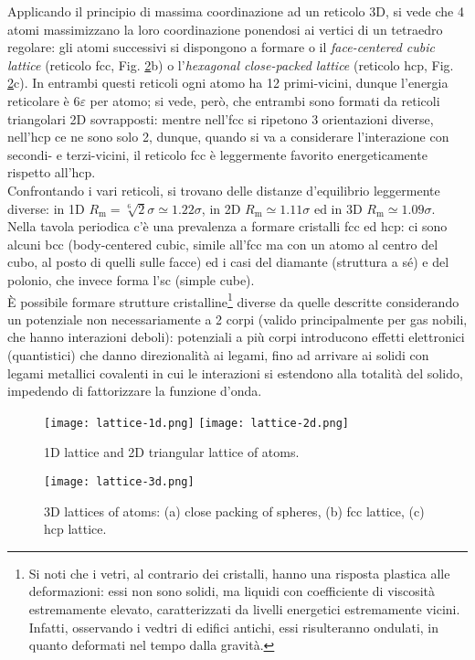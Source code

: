 Applicando il principio di massima coordinazione ad un reticolo 3D, si vede che 4 atomi massimizzano la loro coordinazione ponendosi ai vertici di un tetraedro regolare: gli atomi successivi si dispongono a formare o il \textit{face-centered cubic lattice} (reticolo fcc, Fig. \ref{lat-3}b) o l'\textit{hexagonal close-packed lattice} (reticolo hcp, Fig. \ref{lat-3}c). In entrambi questi reticoli ogni atomo ha 12 primi-vicini, dunque l'energia reticolare è $ 6\varepsilon $ per atomo; si vede, però, che entrambi sono formati da reticoli triangolari 2D sovrapposti: mentre nell'fcc si ripetono 3 orientazioni diverse, nell'hcp ce ne sono solo 2, dunque, quando si va a considerare l'interazione con secondi- e terzi-vicini, il reticolo fcc è leggermente favorito energeticamente rispetto all'hcp. \\
Confrontando i vari reticoli, si trovano delle distanze d'equilibrio leggermente diverse: in 1D $ R_\text{m} = \sqrt[6]{2} \sigma \simeq 1.22 \sigma $, in 2D $ R_\text{m} \simeq 1.11 \sigma $ ed in 3D $ R_\text{m} \simeq 1.09 \sigma $. Nella tavola periodica c'è una prevalenza a formare cristalli fcc ed hcp: ci sono alcuni bcc (body-centered cubic, simile all'fcc ma con un atomo al centro del cubo, al posto di quelli sulle facce) ed i casi del diamante (struttura a sé) e del polonio, che invece forma l'sc (simple cube). \\
È possibile formare strutture cristalline\footnote{Si noti che i vetri, al contrario dei cristalli, hanno una risposta plastica alle deformazioni: essi non sono solidi, ma liquidi con coefficiente di viscosità estremamente elevato, caratterizzati da livelli energetici estremamente vicini. Infatti, osservando i vedtri di edifici antichi, essi risulteranno ondulati, in quanto deformati nel tempo dalla gravità.} diverse da quelle descritte considerando un potenziale non necessariamente a 2 corpi (valido principalmente per gas nobili, che hanno interazioni deboli): potenziali a più corpi introducono effetti elettronici (quantistici) che danno direzionalità ai legami, fino ad arrivare ai solidi con legami metallici covalenti in cui le interazioni si estendono alla totalità del solido, impedendo di fattorizzare la funzione d'onda.

\begin{figure}[!h]
	\centering
	\texttt{[image: lattice-1d.png]}
	\qquad
	\texttt{[image: lattice-2d.png]}
	\caption{1D lattice and 2D triangular lattice of atoms.}
	\label{lat-2}
\end{figure}
\begin{figure}[!h]
	\centering
	\texttt{[image: lattice-3d.png]}
	\caption{3D lattices of atoms: (a) close packing of spheres, (b) fcc lattice, (c) hcp lattice.}
	\label{lat-3}
\end{figure}

